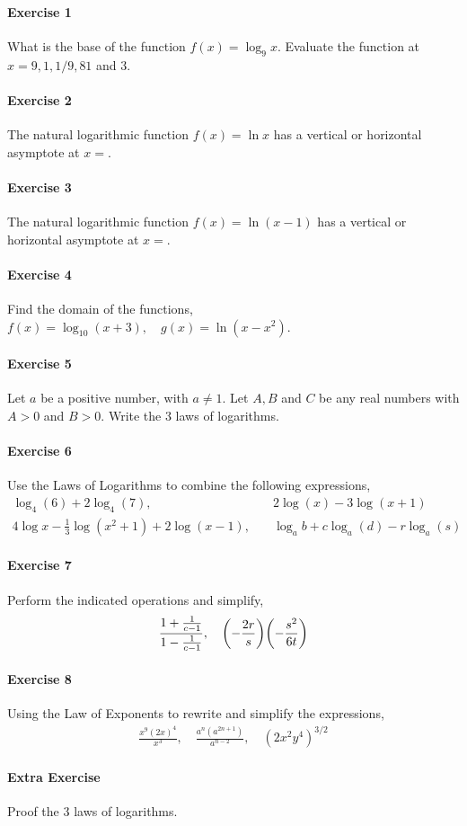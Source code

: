 \documentclass[main.tex]{subfiles}
\begin{document}
\paragraph{Exercise 1}
What is the base of the function $f(x)=\log_9x$.
Evaluate the function at $x=9,1,1/9,81$ and $3$.

\paragraph{Exercise 2}
The natural logarithmic function $f(x)=\ln x$ has a vertical or horizontal asymptote at $x=$.

\paragraph{Exercise 3}
The natural logarithmic function $f(x)=\ln(x-1)$ has a vertical or horizontal asymptote at $x=$.

\paragraph{Exercise 4}
Find the domain of the functions,$f(x)=\log_{10}(x+3),\quad g(x)=\ln(x-x^2)$.

\paragraph{Exercise 5}
Let $a$ be a positive number, with $a\neq 1$.
Let $A,B$ and $C$ be any real numbers with $A>0$ and $B>0$.
Write the 3 laws of logarithms.

\paragraph{Exercise 6}
Use the Laws of Logarithms to combine the following expressions,
\begin{align*}
    \log_4(6) + 2\log_4(7) ,&\quad 2\log(x)-3\log(x+1) \\
    4\log x - \frac{1}{3}\log(x^2+1)+2\log(x-1) ,&\quad \log_a b + c\log_a(d) - r\log_a(s)
\end{align*}


\paragraph{Exercise 7}
Perform the indicated operations and simplify,
\begin{gather*}
    \frac{1+\frac{1}{c-1}}{1-\frac{1}{c-1}},\quad \qty(-\frac{2r}{s})\qty(-\frac{s^2}{6t}) 
\end{gather*}

\paragraph{Exercise 8}
Using the Law of Exponents to rewrite and simplify the expressions,
\begin{gather*}
    \frac{x^9(2x)^4}{x^3},\quad \frac{a^n(a^{2n+1})}{a^{n-2}},\quad (2x^2y^4)^{3/2}
\end{gather*}


\paragraph{Extra Exercise}
Proof the 3 laws of logarithms.
\end{document}
